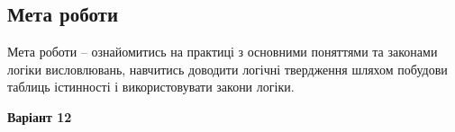 \documentclass[14pt]{extreport}
\begin{document}
\pagestyle{empty}



\subsection*{Мета роботи}

Мета роботи – ознайомитись на практиці з основними поняттями та
законами логіки висловлювань, навчитись доводити логічні твердження шляхом
побудови таблиць істинності і використовувати закони логіки.

\begin{center}\bf Варіант 12\end{center}
%
%
%
%
%
%
\end{document}
